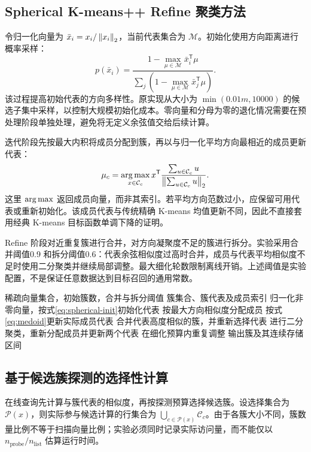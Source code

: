 \subsection{Spherical K-means++ Refine 聚类方法}
令归一化向量为 $\bar x_i=x_i/\left\lVert x_i\right\rVert_2$，当前代表集合为 $\mathcal{M}$。初始化使用方向距离进行概率采样：
\begin{equation}
 p(\bar x_i)=\frac{1-\max_{\mu\in\mathcal M}\bar x_i^{\mathsf T}\mu}
 {\sum_j(1-\max_{\mu\in\mathcal M}\bar x_j^{\mathsf T}\mu)}.
 \label{eq:spherical-init}
\end{equation}
该过程提高初始代表的方向多样性。原实现从大小为 $\min(0.01m,10000)$ 的候选子集中采样，以控制大规模初始化成本。零向量和分母为零的退化情况需要在预处理阶段单独处理，避免将无定义余弦值交给后续计算。

迭代阶段先按最大内积将成员分配到簇，再以与归一化平均方向最相近的成员更新代表：
\begin{equation}
 \mu_c=\operatorname*{arg\,max}_{x\in\mathcal C_c} x^{\mathsf T}
 \frac{\sum_{u\in\mathcal C_c}u}{\left\lVert\sum_{u\in\mathcal C_c}u\right\rVert_2}.
 \label{eq:medoid}
\end{equation}
这里 $\operatorname*{arg\,max}$ 返回成员向量，而非其索引。若平均方向范数过小，应保留可用代表或重新初始化。该成员代表与传统精确 K-means 均值更新不同，因此不直接套用经典 K-means 目标函数单调下降的证明。

Refine 阶段对近重复簇进行合并，对方向凝聚度不足的簇进行拆分。实验采用合并阈值0.9 和拆分阈值0.6：代表余弦相似度过高时合并，成员与代表平均相似度不足时使用二分聚类并继续局部调整。最大细化轮数限制离线开销。上述阈值是实验配置，不是保证任意数据达到目标召回的通用常数。

\begin{algorithm}[htbp]\caption{方向敏感聚类与簇结构细化}\label{alg:cluster}
\begin{algorithmic}[1]
\REQUIRE 稀疏向量集合，初始簇数，合并与拆分阈值
\ENSURE 簇集合、簇代表及成员索引
\STATE 归一化非零向量，按式\eqref{eq:spherical-init}初始化代表
\REPEAT
\STATE 按最大方向相似度分配成员
\STATE 按式\eqref{eq:medoid}更新实际成员代表
\STATE 合并代表高度相似的簇，并重新选择代表
\STATE 进行二分聚类，重新分配成员并更新两个代表
\STATE 在细化预算内重复调整
\ENDFOR
\STATE 输出簇及其连续存储区间
\end{algorithmic}\end{algorithm}

\subsection{基于候选簇探测的选择性计算}
在线查询先计算与簇代表的相似度，再按探测预算选择候选簇。设选择集合为 $\mathcal P(x)$，则实际参与候选计算的行集合为 $\bigcup_{c\in\mathcal P(x)}\mathcal C_c$。由于各簇大小不同，簇数量比例不等于扫描向量比例；实验必须同时记录实际访问量，而不能仅以 $n_{\mathrm{probe}}/n_{\mathrm{list}}$ 估算运行时间。

